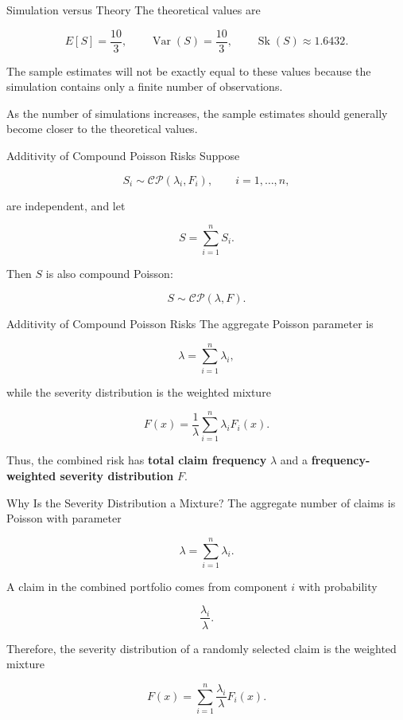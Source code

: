 \documentclass[
  ignorenonframetext,
  aspectratio=169,
]{beamer}
\begin{document}
\begin{frame}{Simulation versus Theory}
\protect{}\label{simulation-versus-theory}
The theoretical values are

\[
E[S]=\frac{10}{3},
\qquad
\operatorname{Var}(S)=\frac{10}{3},
\qquad
\operatorname{Sk}(S)\approx1.6432.
\]

The sample estimates will not be exactly equal to these values because
the simulation contains only a finite number of observations.

As the number of simulations increases, the sample estimates should
generally become closer to the theoretical values.
\end{frame}

\begin{frame}{Additivity of Compound Poisson Risks}
\protect{}\label{additivity-of-compound-poisson-risks}
Suppose

\[
S_i\sim\mathcal{CP}(\lambda_i,F_i),
\qquad i=1,\ldots,n,
\]

are independent, and let

\[
S=\sum_{i=1}^{n}S_i.
\]

Then \(S\) is also compound Poisson:

\[
\boxed{S\sim\mathcal{CP}(\lambda,F)}.
\]
\end{frame}

\begin{frame}{Additivity of Compound Poisson Risks}
\protect{}\label{additivity-of-compound-poisson-risks-1}
The aggregate Poisson parameter is

\[
\boxed{\lambda=\sum_{i=1}^{n}\lambda_i},
\]

while the severity distribution is the weighted mixture

\[
\boxed{
F(x)=\frac{1}{\lambda}
\sum_{i=1}^{n}\lambda_iF_i(x).
}
\]

Thus, the combined risk has \textbf{total claim frequency} \(\lambda\)
and a \textbf{frequency-weighted severity distribution} \(F\).
\end{frame}

\begin{frame}{Why Is the Severity Distribution a Mixture?}
\protect{}\label{why-is-the-severity-distribution-a-mixture}
The aggregate number of claims is Poisson with parameter

\[
\lambda=\sum_{i=1}^{n}\lambda_i.
\]

A claim in the combined portfolio comes from component \(i\) with
probability

\[
\frac{\lambda_i}{\lambda}.
\]

Therefore, the severity distribution of a randomly selected claim is the
weighted mixture

\[
F(x)
=
\sum_{i=1}^{n}
\frac{\lambda_i}{\lambda}F_i(x).
\]
\end{frame}
\end{document}
